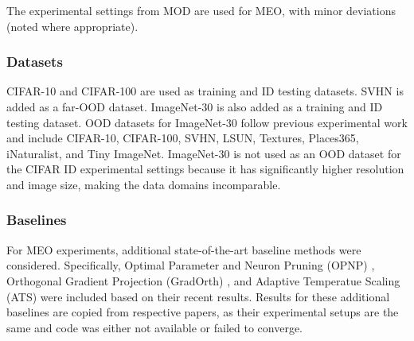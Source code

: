 The experimental settings from MOD are used for MEO, with minor deviations (noted where appropriate). %

\subsubsection{Datasets}
CIFAR-10 and CIFAR-100 \cite{krizhevsky2009learning} are used as training and ID testing datasets. SVHN \cite{yuval2011reading} is added as a far-OOD dataset. ImageNet-30 \cite{russakovsky2015imagenet} is also added as a training and ID testing dataset. OOD datasets for ImageNet-30 follow previous experimental work \cite{li2023rethinking,yang2022openood} and include CIFAR-10, CIFAR-100, SVHN, LSUN, Textures, Places365, iNaturalist, and Tiny ImageNet. ImageNet-30 is not used as an OOD dataset for the CIFAR ID experimental settings because it has significantly higher resolution and image size, making the data domains incomparable.

\subsubsection{Baselines}
For MEO experiments, additional state-of-the-art baseline methods were considered. Specifically, Optimal Parameter and Neuron Pruning (OPNP) \cite{chen2024optimal}, Orthogonal Gradient Projection (GradOrth) \cite{behpour2024gradorth}, and Adaptive Temperatue Scaling (ATS) \cite{krumpl2024ats} were included based on their recent results. Results for these additional baselines are copied from respective papers, as their experimental setups are the same and code was either not available or failed to converge.

